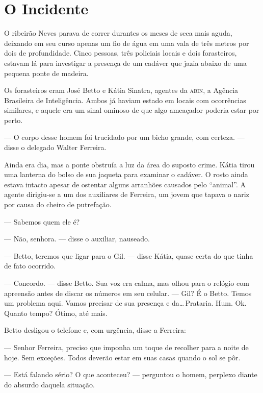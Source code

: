 \chapter{O Incidente}


O ribeirão Neves parava de correr durantes os meses de seca mais aguda,
deixando em seu curso apenas um fio de água em uma vala de três metros
por dois de profundidade. Cinco pessoas, três policiais locais e dois
forasteiros, estavam lá para investigar a presença de um cadáver que
jazia abaixo de uma pequena ponte de madeira.

Os forasteiros eram José Betto e Kátia Sinatra, agentes da
\textsc{abin}, a Agência Brasileira de Inteligência. Ambos já haviam
estado em locais com ocorrências similares, e aquele era um sinal
ominoso de que algo ameaçador poderia estar por perto.

--- O corpo desse homem foi trucidado por um bicho grande, com certeza.
--- disse o delegado Walter Ferreira.

Ainda era dia, mas a ponte obstruía a luz da área do suposto crime.
Kátia tirou uma lanterna do bolso de sua jaqueta para examinar o
cadáver. O rosto ainda estava intacto apesar de ostentar alguns
arranhões causados pelo “animal”. A agente dirigiu-se a um dos
auxiliares de Ferreira, um jovem que tapava o nariz por causa do cheiro
de putrefação.

--- Sabemos quem ele é?

--- Não, senhora. --- disse o auxiliar, nauseado.

--- Betto, teremos que ligar para o Gil. --- disse Kátia, quase certa do
que tinha de fato ocorrido.

--- Concordo. --- disse Betto. Sua voz era calma, mas olhou para o
relógio com apreensão antes de discar os números em seu celular. ---
Gil? É o Betto. Temos um problema aqui. Vamos precisar de sua presença e
da\ldots\,Prataria. Hum. Ok. Quanto tempo? Ótimo, até mais.

Betto desligou o telefone e, com urgência, disse a Ferreira:

--- Senhor Ferreira, preciso que imponha um toque de recolher para a
noite de hoje. Sem exceções. Todos deverão estar em suas casas quando o
sol se pôr.

--- Está falando sério? O que aconteceu? --- perguntou o homem, perplexo
diante do absurdo daquela situação.

